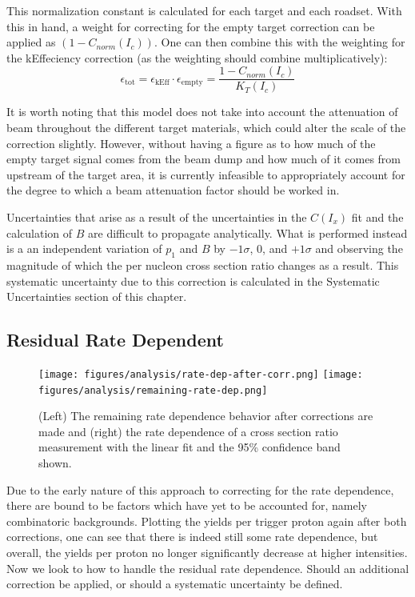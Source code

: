 This normalization constant is calculated for each target and each roadset. With this in hand, a weight for correcting for the empty target correction can be applied as $(1 - C_{norm}(I_c))$. One can then combine this with the weighting for the kEffeciency correction (as the weighting should combine multiplicatively):
\begin{equation}
\epsilon_{\text{tot}} = \epsilon_{\text{kEff}} \cdot \epsilon_{\text{empty}} = \frac{1 - C_{norm}(I_c)}{K_T(I_c)}
\end{equation}

It is worth noting that this model does not take into account the attenuation of beam throughout the different target materials, which could alter the scale of the correction slightly. However, without having a figure as to how much of the empty target signal comes from the beam dump and how much of it comes from upstream of the target area, it is currently infeasible to appropriately account for the degree to which a beam attenuation factor should be worked in.

Uncertainties that arise as a result of the uncertainties in the $C(I_x)$ fit and the calculation of $B$ are difficult to propagate analytically. What is performed instead is a an independent variation of $p_1$ and $B$ by $-1\sigma$, 0, and $+1\sigma$ and observing the magnitude of which the per nucleon cross section ratio changes as a result. This systematic uncertainty due to this correction is calculated in the Systematic Uncertainties section of this chapter.

\subsection{Residual Rate Dependent}

\begin{figure}
	\centering
	\texttt{[image: figures/analysis/rate-dep-after-corr.png]}
	\texttt{[image: figures/analysis/remaining-rate-dep.png]}
	\caption{(Left) The remaining rate dependence behavior after corrections are made and (right) the rate dependence of a cross section ratio measurement with the linear fit and the 95\% confidence band shown.}
	\label{fig:residual-rate-dep}
\end{figure}

Due to the early nature of this approach to correcting for the rate dependence, there are bound to be factors which have yet to be accounted for, namely combinatoric backgrounds. Plotting the yields per trigger proton again after both corrections, one can see that there is indeed still some rate dependence, but overall, the yields per proton no longer significantly decrease at higher intensities. Now we look to how to handle the residual rate dependence. Should an additional correction be applied, or should a systematic uncertainty be defined.

